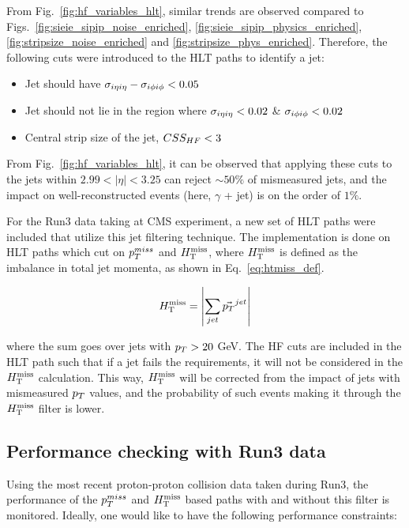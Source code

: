From Fig.~\ref{fig:hf_variables_hlt}, similar trends are observed compared to Figs.~\ref{fig:sieie_sipip_noise_enriched}, \ref{fig:sieie_sipip_physics_enriched}, 
\ref{fig:stripsize_noise_enriched} and \ref{fig:stripsize_phys_enriched}. Therefore, the following cuts were introduced to the HLT paths to identify a jet:

\begin{itemize}
    \item Jet should have $\sigma_{i\eta i\eta} - \sigma_{i\phi i\phi} < 0.05$
    \item Jet should not lie in the region where $\sigma_{i\eta i\eta} < 0.02$ \& $\sigma_{i\phi i\phi} < 0.02$
    \item Central strip size of the jet, $CSS_{HF} < 3$
\end{itemize}

From Fig.~\ref{fig:hf_variables_hlt}, it can be observed that applying these cuts to the jets within $2.99 < |\eta| < 3.25$ can reject $\sim 50\%$ of mismeasured
jets, and the impact on well-reconstructed events (here, $\gamma$ + jet) is on the order of $1\%$. 

For the Run3 data taking at CMS experiment, a new set of HLT paths were included that utilize this jet filtering technique. The implementation is
done on HLT paths which cut on $p_T^{miss}$ and $H_{\mathrm{T}}^{\mathrm{miss}}$, where $H_{\mathrm{T}}^{\mathrm{miss}}$ is defined as the imbalance in total jet momenta, as shown in Eq.~\ref{eq:htmiss_def}.

\begin{equation}
    H_{\mathrm{T}}^{\mathrm{miss}} = \left| \sum_{jet} \vec{p_T}^{jet} \right|
    \label{eq:htmiss_def}
\end{equation}

where the sum goes over jets with $p_T > 20$ GeV. The HF cuts are included in the HLT path such that if a jet fails the requirements, it will not be considered
in the $H_{\mathrm{T}}^{\mathrm{miss}}$ calculation. This way, $H_{\mathrm{T}}^{\mathrm{miss}}$ will be corrected from the impact of jets with mismeasured $p_T$ values, and the probability of such events
making it through the $H_{\mathrm{T}}^{\mathrm{miss}}$ filter is lower.

\subsection{Performance checking with Run3 data}
\label{subsec:trig_perf_check_run3}

Using the most recent proton-proton collision data taken during Run3, the performance of the $p_T^{miss}$ and $H_{\mathrm{T}}^{\mathrm{miss}}$ based paths with and without this filter is
monitored. Ideally, one would like to have the following performance constraints:


